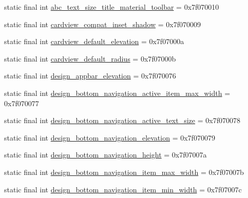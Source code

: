 \begin{CompactItemize}
\item 
static final int \hyperlink{classandroid_1_1support_1_1graphics_1_1drawable_1_1animated_1_1_r_1_1dimen_4c31afaaf3ffab2805006cdd857206e6}{abc\_\-text\_\-size\_\-title\_\-material\_\-toolbar} = 0x7f070010
\item 
static final int \hyperlink{classandroid_1_1support_1_1graphics_1_1drawable_1_1animated_1_1_r_1_1dimen_69393dd06aa2cafb505a3b34635c5122}{cardview\_\-compat\_\-inset\_\-shadow} = 0x7f070009
\item 
static final int \hyperlink{classandroid_1_1support_1_1graphics_1_1drawable_1_1animated_1_1_r_1_1dimen_ef9098436c7b953ee67107c2c76affb1}{cardview\_\-default\_\-elevation} = 0x7f07000a
\item 
static final int \hyperlink{classandroid_1_1support_1_1graphics_1_1drawable_1_1animated_1_1_r_1_1dimen_4f227d4dcff08097a757037657f83bba}{cardview\_\-default\_\-radius} = 0x7f07000b
\item 
static final int \hyperlink{classandroid_1_1support_1_1graphics_1_1drawable_1_1animated_1_1_r_1_1dimen_c552b67437711d81f48f056eec8480b4}{design\_\-appbar\_\-elevation} = 0x7f070076
\item 
static final int \hyperlink{classandroid_1_1support_1_1graphics_1_1drawable_1_1animated_1_1_r_1_1dimen_233b7c7d4907c033d6623d542ac6c092}{design\_\-bottom\_\-navigation\_\-active\_\-item\_\-max\_\-width} = 0x7f070077
\item 
static final int \hyperlink{classandroid_1_1support_1_1graphics_1_1drawable_1_1animated_1_1_r_1_1dimen_4ac31e933d57d83aef7e901654fb08a8}{design\_\-bottom\_\-navigation\_\-active\_\-text\_\-size} = 0x7f070078
\item 
static final int \hyperlink{classandroid_1_1support_1_1graphics_1_1drawable_1_1animated_1_1_r_1_1dimen_5a0c71ec8eff35dd7cfa1dd5efb68f28}{design\_\-bottom\_\-navigation\_\-elevation} = 0x7f070079
\item 
static final int \hyperlink{classandroid_1_1support_1_1graphics_1_1drawable_1_1animated_1_1_r_1_1dimen_ad095a66b5be94a6226291e422641f6b}{design\_\-bottom\_\-navigation\_\-height} = 0x7f07007a
\item 
static final int \hyperlink{classandroid_1_1support_1_1graphics_1_1drawable_1_1animated_1_1_r_1_1dimen_007732d143ecbc7dd4ac1e03abb4ae57}{design\_\-bottom\_\-navigation\_\-item\_\-max\_\-width} = 0x7f07007b
\item 
static final int \hyperlink{classandroid_1_1support_1_1graphics_1_1drawable_1_1animated_1_1_r_1_1dimen_ecc062a3e80bcbc59207ca340e525058}{design\_\-bottom\_\-navigation\_\-item\_\-min\_\-width} = 0x7f07007c

\end{CompactItemize}
